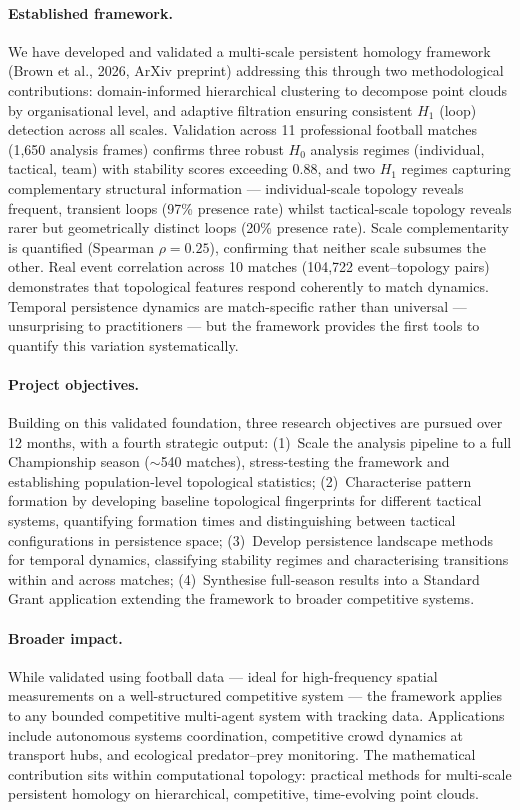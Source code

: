 \paragraph{Established framework.}
We have developed and validated a multi-scale persistent homology framework (Brown et al., 2026, ArXiv preprint) addressing this through two methodological contributions: domain-informed hierarchical clustering to decompose point clouds by organisational level, and adaptive filtration ensuring consistent $H_1$ (loop) detection across all scales. Validation across 11 professional football matches (1{,}650 analysis frames) confirms three robust $H_0$ analysis regimes (individual, tactical, team) with stability scores exceeding 0.88, and two $H_1$ regimes capturing complementary structural information --- individual-scale topology reveals frequent, transient loops (97\% presence rate) whilst tactical-scale topology reveals rarer but geometrically distinct loops (20\% presence rate). Scale complementarity is quantified (Spearman $\rho = 0.25$), confirming that neither scale subsumes the other. Real event correlation across 10 matches (104{,}722 event--topology pairs) demonstrates that topological features respond coherently to match dynamics. Temporal persistence dynamics are match-specific rather than universal --- unsurprising to practitioners --- but the framework provides the first tools to quantify this variation systematically.

\paragraph{Project objectives.}
Building on this validated foundation, three research objectives are pursued over 12 months, with a fourth strategic output: (1)~Scale the analysis pipeline to a full Championship season ($\sim$540 matches), stress-testing the framework and establishing population-level topological statistics; (2)~Characterise pattern formation by developing baseline topological fingerprints for different tactical systems, quantifying formation times and distinguishing between tactical configurations in persistence space; (3)~Develop persistence landscape methods for temporal dynamics, classifying stability regimes and characterising transitions within and across matches; (4)~Synthesise full-season results into a Standard Grant application extending the framework to broader competitive systems.

\paragraph{Broader impact.}
While validated using football data --- ideal for high-frequency spatial measurements on a well-structured competitive system --- the framework applies to any bounded competitive multi-agent system with tracking data. Applications include autonomous systems coordination, competitive crowd dynamics at transport hubs, and ecological predator--prey monitoring. The mathematical contribution sits within computational topology: practical methods for multi-scale persistent homology on hierarchical, competitive, time-evolving point clouds.

